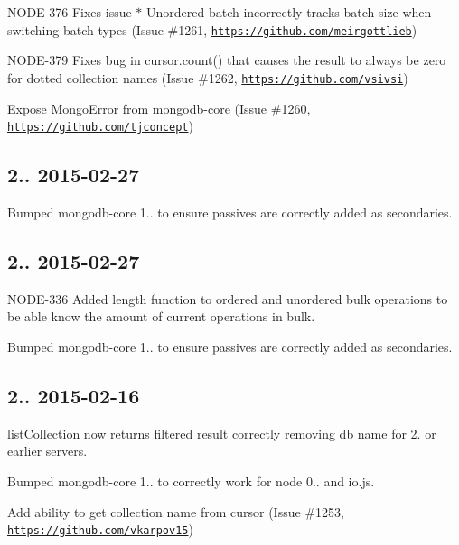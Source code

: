\begin{DoxyItemize}
\item N\+O\+D\+E-\/376 Fixes issue $\ast$ Unordered batch incorrectly tracks batch size when switching batch types (Issue \#1261, \href{https://github.com/meirgottlieb}{\tt https\+://github.\+com/meirgottlieb})
\item N\+O\+D\+E-\/379 Fixes bug in cursor.\+count() that causes the result to always be zero for dotted collection names (Issue \#1262, \href{https://github.com/vsivsi}{\tt https\+://github.\+com/vsivsi})
\item Expose Mongo\+Error from mongodb-\/core (Issue \#1260, \href{https://github.com/tjconcept}{\tt https\+://github.\+com/tjconcept})
\end{DoxyItemize}

\subsection*{2.. 2015-\/02-\/27 }


\begin{DoxyItemize}
\item Bumped mongodb-\/core 1.. to ensure passives are correctly added as secondaries.
\end{DoxyItemize}

\subsection*{2.. 2015-\/02-\/27 }


\begin{DoxyItemize}
\item N\+O\+D\+E-\/336 Added length function to ordered and unordered bulk operations to be able know the amount of current operations in bulk.
\item Bumped mongodb-\/core 1.. to ensure passives are correctly added as secondaries.
\end{DoxyItemize}

\subsection*{2.. 2015-\/02-\/16 }


\begin{DoxyItemize}
\item list\+Collection now returns filtered result correctly removing db name for 2. or earlier servers.
\item Bumped mongodb-\/core 1.. to correctly work for node 0.. and io.\+js.
\item Add ability to get collection name from cursor (Issue \#1253, \href{https://github.com/vkarpov15}{\tt https\+://github.\+com/vkarpov15})
\end{DoxyItemize}

